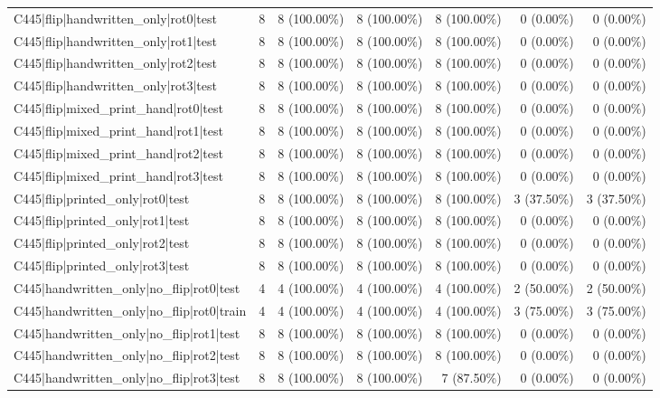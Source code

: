 \begin{longtable}{>{\raggedright\arraybackslash}p{5cm}rrrrrr}
C445|flip|handwritten\_only|rot0|test & 8 & 8 (100.00\%) & 8 (100.00\%) & 8 (100.00\%) & 0 (0.00\%) & 0 (0.00\%) \\
C445|flip|handwritten\_only|rot1|test & 8 & 8 (100.00\%) & 8 (100.00\%) & 8 (100.00\%) & 0 (0.00\%) & 0 (0.00\%) \\
C445|flip|handwritten\_only|rot2|test & 8 & 8 (100.00\%) & 8 (100.00\%) & 8 (100.00\%) & 0 (0.00\%) & 0 (0.00\%) \\
C445|flip|handwritten\_only|rot3|test & 8 & 8 (100.00\%) & 8 (100.00\%) & 8 (100.00\%) & 0 (0.00\%) & 0 (0.00\%) \\
C445|flip|mixed\_print\_hand|rot0|test & 8 & 8 (100.00\%) & 8 (100.00\%) & 8 (100.00\%) & 0 (0.00\%) & 0 (0.00\%) \\
C445|flip|mixed\_print\_hand|rot1|test & 8 & 8 (100.00\%) & 8 (100.00\%) & 8 (100.00\%) & 0 (0.00\%) & 0 (0.00\%) \\
C445|flip|mixed\_print\_hand|rot2|test & 8 & 8 (100.00\%) & 8 (100.00\%) & 8 (100.00\%) & 0 (0.00\%) & 0 (0.00\%) \\
C445|flip|mixed\_print\_hand|rot3|test & 8 & 8 (100.00\%) & 8 (100.00\%) & 8 (100.00\%) & 0 (0.00\%) & 0 (0.00\%) \\
C445|flip|printed\_only|rot0|test & 8 & 8 (100.00\%) & 8 (100.00\%) & 8 (100.00\%) & 3 (37.50\%) & 3 (37.50\%) \\
C445|flip|printed\_only|rot1|test & 8 & 8 (100.00\%) & 8 (100.00\%) & 8 (100.00\%) & 0 (0.00\%) & 0 (0.00\%) \\
C445|flip|printed\_only|rot2|test & 8 & 8 (100.00\%) & 8 (100.00\%) & 8 (100.00\%) & 0 (0.00\%) & 0 (0.00\%) \\
C445|flip|printed\_only|rot3|test & 8 & 8 (100.00\%) & 8 (100.00\%) & 8 (100.00\%) & 0 (0.00\%) & 0 (0.00\%) \\
C445|handwritten\_only|no\_flip|rot0|test & 4 & 4 (100.00\%) & 4 (100.00\%) & 4 (100.00\%) & 2 (50.00\%) & 2 (50.00\%) \\
C445|handwritten\_only|no\_flip|rot0|train & 4 & 4 (100.00\%) & 4 (100.00\%) & 4 (100.00\%) & 3 (75.00\%) & 3 (75.00\%) \\
C445|handwritten\_only|no\_flip|rot1|test & 8 & 8 (100.00\%) & 8 (100.00\%) & 8 (100.00\%) & 0 (0.00\%) & 0 (0.00\%) \\
C445|handwritten\_only|no\_flip|rot2|test & 8 & 8 (100.00\%) & 8 (100.00\%) & 8 (100.00\%) & 0 (0.00\%) & 0 (0.00\%) \\
C445|handwritten\_only|no\_flip|rot3|test & 8 & 8 (100.00\%) & 8 (100.00\%) & 7 (87.50\%) & 0 (0.00\%) & 0 (0.00\%) \\

\end{longtable}
